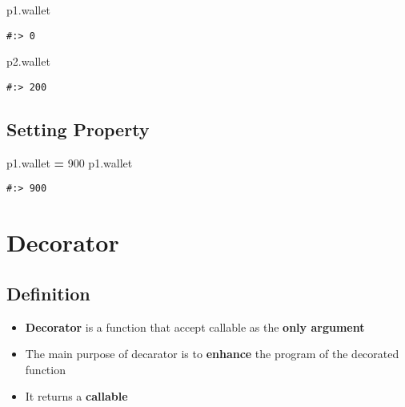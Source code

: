 \documentclass[
]{book}
\newenvironment{Shaded}{\begin{snugshade}}{\end{snugshade}}
\newcommand{\DecValTok}[1]{\textcolor[rgb]{0.06,0.06,0.06}{#1}}
\newcommand{\NormalTok}[1]{#1}
\newcommand{\OperatorTok}[1]{\textcolor[rgb]{0.43,0.43,0.43}{\textbf{#1}}}
\providecommand{\tightlist}{%
  \setlength{\itemsep}{0pt}\setlength{\parskip}{0pt}}
\begin{document}
\begin{Shaded}
\begin{Highlighting}[]
\NormalTok{p1.wallet}
\end{Highlighting}
\end{Shaded}

\begin{verbatim}
#:> 0
\end{verbatim}

\begin{Shaded}
\begin{Highlighting}[]
\NormalTok{p2.wallet}
\end{Highlighting}
\end{Shaded}

\begin{verbatim}
#:> 200
\end{verbatim}

\hypertarget{setting-property}{%
\section{Setting Property}\label{setting-property}}

\begin{Shaded}
\begin{Highlighting}[]
\NormalTok{p1.wallet }\OperatorTok{=} \DecValTok{900}
\NormalTok{p1.wallet}
\end{Highlighting}
\end{Shaded}

\begin{verbatim}
#:> 900
\end{verbatim}

\hypertarget{decorator}{%
\chapter{Decorator}\label{decorator}}

\hypertarget{definition}{%
\section{Definition}\label{definition}}

\begin{itemize}
\tightlist
\item
  \textbf{Decorator} is a function that accept callable as the \textbf{only argument}
\item
  The main purpose of decarator is to \textbf{enhance} the program of the decorated function
\item
  It returns a \textbf{callable}
\end{itemize}
\end{document}
